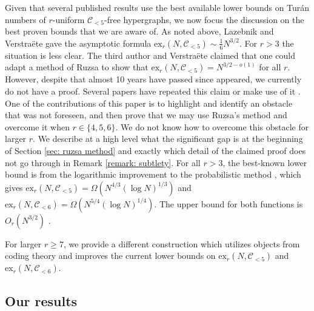 \documentclass[12pt]{article}%
\begin{document}
Given that several published results use the best available lower   
bounds on Tur\'{a}n numbers of $r$-uniform $\mathcal{C}_{ < 5}$-free hypergraphs, we now focus the discussion on the best proven bounds that we are aware of.
As noted above, Lazebnik and Verstra\"ete gave the asymptotic formula $\mathrm{ex}_r(N, \mathcal{C}_{<5}) \sim \frac{1}{6}N^{3/2}$. For $r>3$ the situation is less clear. 
The third author and Verstra\"{e}te \cite{TV} claimed that 
one could adapt a method of Ruzsa \cite{Ruzsa} to show that $\mathrm{ex}_r(N, \mathcal{C}_{<5}) = N^{3/2-o(1)}$ for all $r$.   However, despite that almost 10 years have passed since \cite{TV} appeared, we currently do not have a proof.  Several papers have repeated this claim \cite{TimmonsThesis, Spiro3, Spiro1, Spiro2} or make use of it \cite{GerbnerPatkos, PachVizer, ShangguanTamo1, XingYuan}.  
One of the contributions of this paper is to highlight and identify an obstacle that 
was not foreseen, and then prove that we may use Ruzsa's method and overcome it when $r \in \{4,5,6 \}$.  
We do not know how to overcome this obstacle for larger $r$.  We describe at a high level what the significant gap is at the beginning of Section \ref{sec: ruzsa method} and exactly which detail of the claimed proof does not go through in Remark \ref{remark: subtlety}.    
For all $r>3$, 
the best-known lower bound is from the logarithmic improvement to the probabilistic method \cite{ShangguanTamo1}, which gives $\mathrm{ex}_r(N, \mathcal{C}_{<5}) = \Omega \left(N^{4/3}(\log N)^{1/3}\right)$ and $\mathrm{ex}_r(N, \mathcal{C}_{<6}) = \Omega \left(N^{5/4} (\log N)^{1/4}\right)$. The upper bound for both functions is $O_r(N^{3/2})$ \cite{GL}. 

For larger $r \geq 7$, we provide a different construction which utilizes objects from coding theory and improves the current lower bounds on $\mathrm{ex}_r(N, \mathcal{C}_{<5})$ and $\mathrm{ex}_r(N, \mathcal{C}_{<6})$.



\subsection{Our results}
\end{document}
